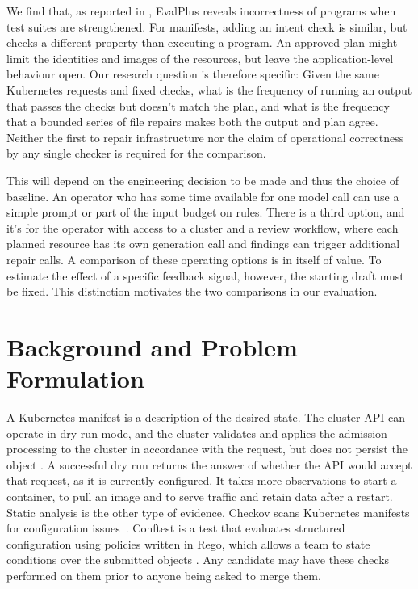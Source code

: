 \documentclass[12pt,onecolumn,draftclsnofoot]{IEEEtran}
\begin{document}
We find that, as reported in \cite{evalplus}, EvalPlus reveals incorrectness of programs when test suites are strengthened. For manifests, adding an intent check is similar, but checks a different property than executing a program. An approved plan might limit the identities and images of the resources, but leave the application-level behaviour open. Our research question is therefore specific: Given the same Kubernetes requests and fixed checks, what is the frequency of running an output that passes the checks but doesn't match the plan, and what is the frequency that a bounded series of file repairs makes both the output and plan agree. Neither the first to repair infrastructure nor the claim of operational correctness by any single checker is required for the comparison.

This will depend on the engineering decision to be made and thus the choice of baseline. An operator who has some time available for one model call can use a simple prompt or part of the input budget on rules. There is a third option, and it's for the operator with access to a cluster and a review workflow, where each planned resource has its own generation call and findings can trigger additional repair calls. A comparison of these operating options is in itself of value. To estimate the effect of a specific feedback signal, however, the starting draft must be fixed. This distinction motivates the two comparisons in our evaluation.

\section{Background and Problem Formulation}
A Kubernetes manifest is a description of the desired state. The cluster API can operate in dry-run mode, and the cluster validates and applies the admission processing to the cluster in accordance with the request, but does not persist the object \cite{api}. A successful dry run returns the answer of whether the API would accept that request, as it is currently configured. It takes more observations to start a container, to pull an image and to serve traffic and retain data after a restart. Static analysis is the other type of evidence. Checkov scans Kubernetes manifests for configuration issues~\cite{ckv}. Conftest is a test that evaluates structured configuration using policies written in Rego, which allows a team to state conditions over the submitted objects \cite{ct,rego}. Any candidate may have these checks performed on them prior to anyone being asked to merge them.
\end{document}
